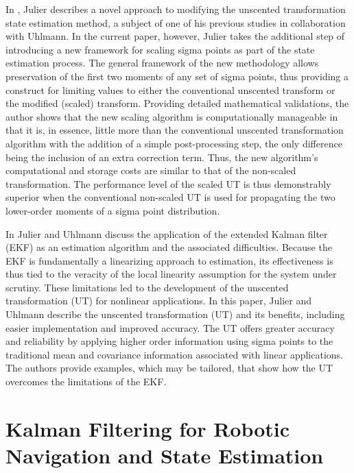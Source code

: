 In \cite{Julier2002}, Julier describes a novel approach to modifying the unscented transformation state estimation method, a subject of one of his previous studies in collaboration with Uhlmann. In the current paper, however, Julier takes the additional step of introducing a new framework for scaling sigma points as part of the state estimation process. The general framework of the new methodology allows preservation of the first two moments of any set of sigma points, thus providing a construct for limiting values to either the conventional unscented transform or the modified (scaled) transform. Providing detailed mathematical validations, the author shows that the new scaling algorithm is computationally manageable in that it is, in essence, little more than the conventional unscented transformation algorithm with the addition of a simple post-processing step, the only difference being the inclusion of an extra correction term. Thus, the new algorithm's computational and storage costs are similar to that of the non-scaled transformation. The performance level of the scaled UT is thus demonstrably superior when the conventional non-scaled UT is used for propagating the two lower-order moments of a sigma point distribution.

In \cite{Julier2004} Julier and Uhlmann discuss the application of the extended Kalman filter (EKF) as an estimation algorithm and the associated difficulties. Because the EKF is fundamentally a linearizing approach to estimation, its effectiveness is thus tied to the veracity of the local linearity assumption for the system under scrutiny. These limitations led to the development of the unscented transformation (UT) for nonlinear applications. In this paper, Julier and Uhlmann describe the unscented transformation (UT) and its benefits, including easier implementation and improved accuracy. The UT offers greater accuracy and reliability by applying higher order information using sigma points to the traditional mean and covariance information associated with linear applications. The authors provide examples, which may be tailored, that show how the UT overcomes the limitations of the EKF.

\section{Kalman Filtering for Robotic Navigation and State Estimation}

